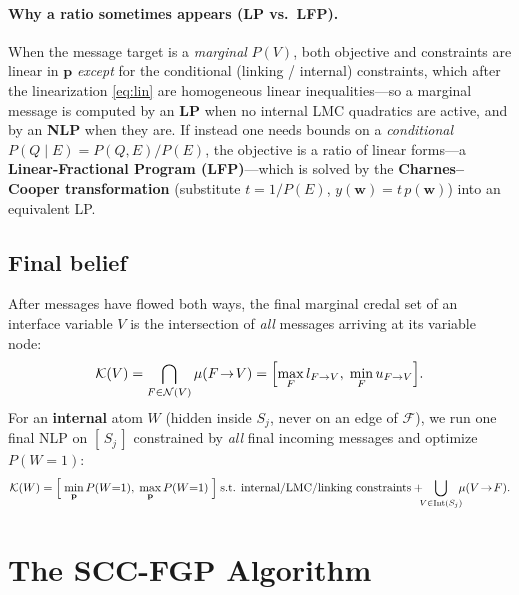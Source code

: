 \documentclass[11pt]{article}
\newcommand{\cK}{\mathcal{K}}
\newcommand{\cF}{\mathcal{F}}
\newcommand{\cN}{\mathcal{N}}
\newcommand{\bp}{\mathbf{p}}
\newcommand{\Iface}{\mathrm{Int}}      %
\begin{document}
\paragraph{Why a ratio sometimes appears (LP vs.\ LFP).}
When the message target is a \emph{marginal} $P(V)$, both objective and
constraints are linear in $\bp$ \emph{except} for the conditional (linking /
internal) constraints, which after the linearization \eqref{eq:lin} are
homogeneous linear inequalities---so a marginal message is computed by an
\textbf{LP} when no internal LMC quadratics are active, and by an
\textbf{NLP} when they are. If instead one needs bounds on a \emph{conditional}
$P(Q\mid E)=P(Q,E)/P(E)$, the objective is a ratio of linear forms---a
\textbf{Linear-Fractional Program (LFP)}---which is solved by the
\textbf{Charnes--Cooper transformation} (substitute $t=1/P(E)$,
$y(\mathbf{w})=t\,p(\mathbf{w})$) into an equivalent LP.

\subsection{Final belief}

After messages have flowed both ways, the final marginal credal set of an
interface variable $V$ is the intersection of \emph{all} messages arriving at
its variable node:
\begin{equation}\label{eq:final-iface}
  \cK(V) = \bigcap_{F\in\cN(V)} \mu(F\!\to\!V)
         = \Bigl[\max_F l_{F\to V},\;\min_F u_{F\to V}\Bigr].
\end{equation}
For an \textbf{internal} atom $W$ (hidden inside $S_j$, never on an edge of
$\cF$), we run one final NLP on $[\,S_j\,]$ constrained by \emph{all} final
incoming messages and optimize $P(W{=}1)$:
\begin{equation}\label{eq:final-internal}
  \cK(W) = \Bigl[\;\min_{\bp}P(W{=}1),\;\max_{\bp}P(W{=}1)\;\Bigr]
  \;\text{s.t. internal/LMC/linking constraints} +\!\!\!
  \bigcup_{V\in\Iface(S_j)}\!\!\!\mu(V\!\to\!F).
\end{equation}

\section{The SCC-FGP Algorithm}\label{sec:alg}
\end{document}
